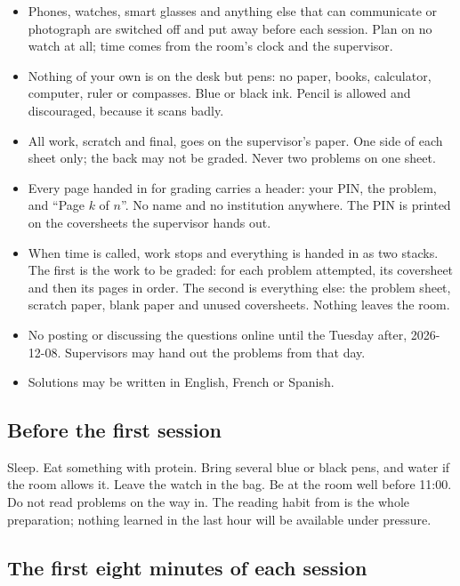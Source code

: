 \begin{itemize}[nosep,leftmargin=*]
\item Phones, watches, smart glasses and anything else that can communicate or photograph are switched off and put away before each session. Plan on no watch at all; time comes from the room's clock and the supervisor.
\item Nothing of your own is on the desk but pens: no paper, books, calculator, computer, ruler or compasses. Blue or black ink. Pencil is allowed and discouraged, because it scans badly.
\item All work, scratch and final, goes on the supervisor's paper. One side of each sheet only; the back may not be graded. Never two problems on one sheet.
\item Every page handed in for grading carries a header: your PIN, the problem, and ``Page $k$ of $n$''. No name and no institution anywhere. The PIN is printed on the coversheets the supervisor hands out.
\item When time is called, work stops and everything is handed in as two stacks. The first is the work to be graded: for each problem attempted, its coversheet and then its pages in order. The second is everything else: the problem sheet, scratch paper, blank paper and unused coversheets. Nothing leaves the room.
\item No posting or discussing the questions online until the Tuesday after, 2026-12-08. Supervisors may hand out the problems from that day.
\item Solutions may be written in English, French or Spanish.
\end{itemize}

\subsection*{Before the first session}

Sleep. Eat something with protein. Bring several blue or black pens, and water if the room allows it. Leave the watch in the bag. Be at the room well before 11:00. Do not read problems on the way in. The reading habit from  is the whole preparation; nothing learned in the last hour will be available under pressure.

\subsection*{The first eight minutes of each session}

